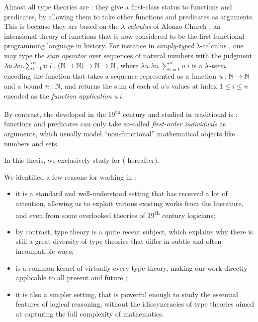 Almost all type theories are : they give a first-class
status to functions and predicates, by allowing them to take other functions and
predicates as arguments. This is because they are based on the
\emph{$\lambda$-calculus} of Alonzo Church
, an intensional theory of
 functions that is now considered to be the first functional
programming language in history. For instance in \emph{simply-typed}
$\lambda$-calculus , one may type
the \emph{sum operator} over sequences of natural numbers with the judgment
$\lambda u. \lambda n. \sum_{i = 1}^{n}{u~i} : (\mathbb{N} \to \mathbb{N}) \to \mathbb{N} \to
\mathbb{N}$, where $\lambda u. \lambda n. \sum_{i = 1}^{n}{u~i}$ is a
\emph{$\lambda$-term} encoding the  function that takes a sequence
represented as a function $u : \mathbb{N} \to \mathbb{N}$ and a bound $n : \mathbb{N}$, and
returns the sum of each of $u$'s values at index $1 \leq i \leq n$ encoded as
the \emph{function application} $u~i$.

By contrast, the  developed in the 19\textsuperscript{th}
century and studied in traditional  is :
functions and predicates can only take so-called \emph{first-order individuals}
as arguments, which usually model ``non-functional'' mathematical objects like
numbers and sets.

\begin{emphpar}
In this thesis, we exclusively study  for \emph{}
 ( hereafter).
\end{emphpar}

We identified a few reasons for working in :
\begin{itemize}
  \item it is a standard and well-understood setting that has received a lot of
  attention, allowing us to exploit various existing works from the  literature, and even from some overlooked theories of
  19\textsuperscript{th} century logicians;
  \item by contrast, type theory is a quite recent subject, which explains why there is still a
  great diversity of type theories that differ in subtle and often incompatible
  ways;
  \item {} is a common kernel of virtually every type theory, making our work
  directly applicable to all present and future ;
  \item it is also a simpler setting, that is powerful enough to study the
  essential features of logical reasoning, without the idiosyncracies of type
  theories aimed at capturing the full complexity of mathematics.
\end{itemize}

